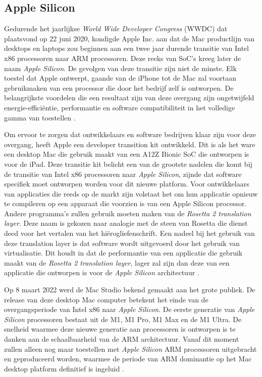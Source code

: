 \subsection{Apple Silicon}
Gedurende het jaarlijkse \textit{World Wide Developer Congress} (WWDC) dat plaatsvond op 22 juni 2020, kondigde Apple Inc. aan dat de Mac productlijn van desktops en laptops zou beginnen aan een twee jaar durende transitie van Intel x86 processoren naar ARM processoren. Deze reeks van SoC’s kreeg later de naam \textit{Apple Silicon}. De gevolgen van deze transitie zijn niet de minste. Elk toestel dat Apple ontwerpt, gaande van de iPhone tot de Mac zal voortaan gebruikmaken van een processor die door het bedrijf zelf is ontworpen. De belangrijkste voordelen die een resultaat zijn van deze overgang zijn ongetwijfeld energie-efficiëntie, performantie en software compatibiliteit in het volledige gamma van toestellen \autocite{Liao2022}.

Om ervoor te zorgen dat ontwikkelaars en software bedrijven klaar zijn voor deze overgang, heeft Apple een developer transition kit ontwikkeld. Dit is als het ware een desktop Mac die gebruik maakt van een A12Z Bionic SoC die ontworpen is voor de iPad. Deze transitie kit belicht een van de grootste nadelen die komt bij de transitie van Intel x86 processoren naar \textit{Apple Silicon}, zijnde dat software specifiek moet ontworpen worden voor dit nieuwe platform. Voor ontwikkelaars van applicaties die reeds op de markt zijn volstaat het om hun applicatie opnieuw te compileren op een apparaat die voorzien is van een Apple Silicon processor. Andere programma's zullen gebruik moeten maken van de \textit{Rosetta 2 translation layer}. Deze naam is gekozen naar analogie met de steen van Rosetta die dienst deed voor het vertalen van het hiërogliefenschrift. Een nadeel bij het gebruik van deze translation layer is dat software wordt uitgevoerd door het gebruik van virtualisatie. Dit houdt in dat de performantie van een applicatie die gebruik maakt van de \textit{Rosetta 2 translation layer}, lager zal zijn dan deze van een applicatie die ontworpen is voor de \textit{Apple Silicon} architectuur \autocite{Apple2020}.

Op 8 maart 2022 werd de Mac Studio bekend gemaakt aan het grote publiek. De release van deze desktop Mac computer betekent het einde van de overgangsperiode van Intel x86 naar \textit{Apple Silicon}. De eerste generatie van \textit{Apple Silicon} processoren bestaat uit de M1, M1 Pro, M1 Max en de M1 Ultra. De snelheid waarmee deze nieuwe generatie aan processoren is ontworpen is te danken aan de schaalbaarheid van de ARM architectuur. Vanaf dit moment zullen alleen nog maar toestellen met \textit{Apple Silicon} ARM processoren uitgebracht en geproduceerd worden, waarmee de periode van ARM dominantie op het Mac desktop platform definitief is ingeluid \autocite{Apple2022}. 

